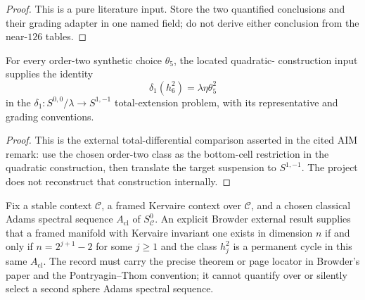 \begin{proof}
  This is a pure literature input.  Store the two quantified conclusions and
  their grading adapter in one named field; do not derive either conclusion
  from the near-$126$ tables.
\end{proof}

\begin{theorem}
  \label{thm:external-total-differential-identity}
  \notready
  For every order-two synthetic choice $\theta_5$, the located quadratic-
  construction input supplies the identity
  \[
    \delta_1(h_6^2)=\lambda\eta\theta_5^2
  \]
  in the $\delta_1:S^{0,0}/\lambda\to S^{1,-1}$ total-extension problem, with
  its representative and grading conventions.
\end{theorem}

\begin{proof}
  This is the external total-differential comparison asserted in the cited AIM
  remark: use the chosen order-two class as the bottom-cell restriction in the
  quadratic construction, then translate the target suspension to $S^{1,-1}$.
  The project does not reconstruct that construction internally.
\end{proof}

\begin{theorem}
  \label{thm:external-browder-criterion}
  \notready
  Fix a stable context $\mathcal C$, a framed Kervaire context over
  $\mathcal C$, and a chosen classical Adams spectral sequence
  $A_{\mathrm{cl}}$ of $S^0_{\mathcal C}$.  An explicit Browder external result
  supplies that a framed manifold with Kervaire invariant one exists in
  dimension $n$ if and only if $n=2^{j+1}-2$ for some $j\ge1$ and the class
  $h_j^2$ is a permanent cycle in this same $A_{\mathrm{cl}}$.  The record must
  carry the precise theorem or page locator in Browder's paper and the
  Pontryagin--Thom convention; it cannot quantify over or silently select a
  second sphere Adams spectral sequence.
\end{theorem}

